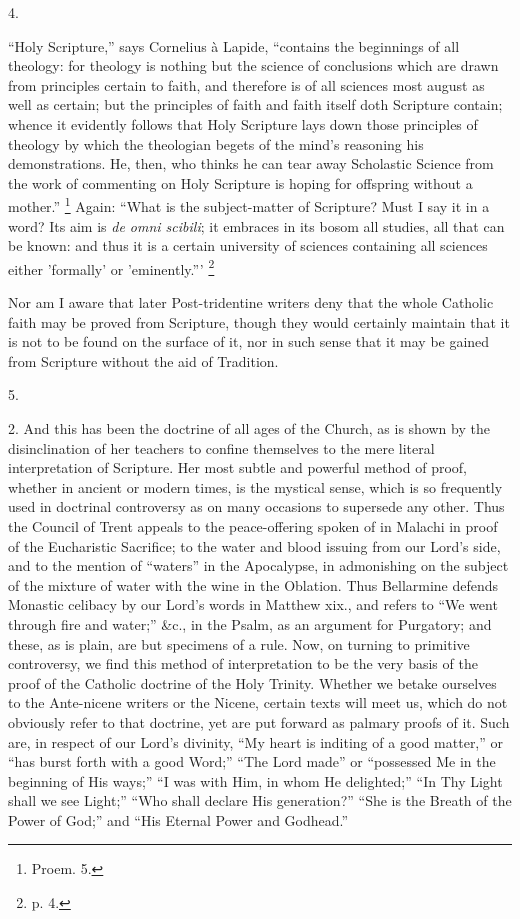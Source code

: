 4.

``Holy Scripture,'' says Cornelius à Lapide,
``contains the beginnings of all theology: for theology is nothing
but the science of conclusions which are drawn from principles certain
to faith, and therefore is of all sciences most august as well as
certain; but the principles of faith and faith itself doth Scripture
contain; whence it evidently follows that Holy Scripture lays down
those principles of theology by which the theologian begets of the
mind's reasoning his demonstrations. He, then, who thinks he can tear
away Scholastic Science from the work of commenting on Holy Scripture
is hoping for offspring without a mother.'' \footnote{Proem. 5.} Again: ``What is the subject-matter of Scripture? Must I
say it in a word? Its aim is \emph{de omni scibili}; it embraces in
its bosom all studies, all that can be known: and thus it is a certain
university of sciences containing all sciences either 'formally' or
'eminently.''' \footnote{p. 4.}

Nor am I aware that later Post-tridentine writers deny that the
whole Catholic faith may be proved from Scripture, though they would
certainly maintain that it is not to be found on the surface of it,
nor in such sense that it may be gained from Scripture without the aid
of Tradition.

5.

2. And this has been the doctrine of all ages of the Church, as is
shown by the disinclination of her teachers to confine themselves to
the mere literal interpretation of Scripture. Her most subtle and
powerful method of proof, whether in ancient or modern times, is the
mystical sense, which is so frequently used in doctrinal controversy
as on many occasions to supersede any other. Thus the Council of Trent
appeals to the peace-offering spoken of in Malachi in proof of the
Eucharistic Sacrifice; to the water and blood issuing from our Lord's
side, and to the mention of ``waters'' in the Apocalypse, in
admonishing on the subject of the mixture of water with the wine in
the Oblation. Thus Bellarmine defends Monastic celibacy by our Lord's
words in Matthew xix., and refers to ``We went through fire and
water;'' \&c., in the Psalm, as an argument for Purgatory; and
these, as is plain, are but specimens of a rule. Now, on turning to
primitive controversy, we find this method of interpretation to be the
very basis of the proof of the Catholic doctrine of the Holy Trinity.
Whether we betake ourselves to the Ante-nicene writers or the Nicene,
certain texts will meet us, which do not obviously refer to that
doctrine, yet are put forward as palmary proofs of it. Such are, in
respect of our Lord's divinity, ``My heart is inditing of a good
matter,'' or ``has burst forth with a good Word;''
``The Lord made'' or ``possessed Me in the beginning of
His ways;'' ``I was with Him, in whom He delighted;''
``In Thy Light shall we see Light;'' ``Who shall declare
His generation?'' ``She is the Breath of the Power of
God;'' and ``His Eternal Power and Godhead.''

